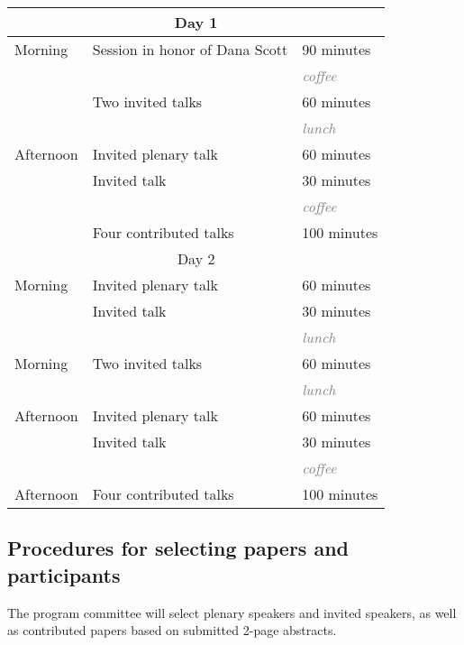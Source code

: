 \documentclass{article}
\newcommand{\grey}{\textcolor{grey}}
\begin{document}
\begin{center}
\begin{tabular}{lll}
\multicolumn{3}{c}{Day 1} \\ \midrule
Morning   & Session in honor of Dana Scott & 90 minutes \\
          &                                & \grey{\emph{coffee}}\\
          & Two invited talks              & 60 minutes \\
          &                                & \grey{\emph{lunch}}   \\
Afternoon & Invited plenary talk           & 60 minutes \\
          & Invited talk                   & 30 minutes \\
          &                                & \grey{\emph{coffee}} \\
          & Four contributed talks         & 100 minutes \\[2ex]
\multicolumn{3}{c}{Day 2} \\ \midrule
Morning   & Invited plenary talk           & 60 minutes \\
          & Invited talk                   & 30 minutes \\
          &                                & \grey{\emph{lunch}}  \\
Morning   & Two invited talks              & 60 minutes \\
          &                                & \grey{\emph{lunch}}  \\
Afternoon & Invited plenary talk           & 60 minutes \\
          & Invited talk                   & 30 minutes \\
          &                                & \grey{\emph{coffee}} \\
Afternoon & Four contributed talks         & 100 minutes \\
\end{tabular}
\end{center}

\subsection{Procedures for selecting papers and participants}

The program committee will select plenary speakers and invited speakers, as well as contributed papers based on submitted 2-page abstracts. 
\end{document}
